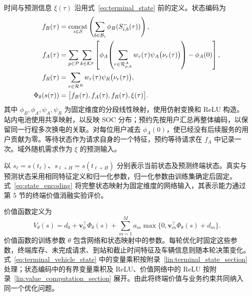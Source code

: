 时间与预测信息 $\xi(\tau)$ 沿用式~\eqref{eq:terminal_state} 前的定义。状态编码为
\begin{equation}
\begin{aligned}
f_B(\tau)&=\mathop{\mathrm{concat}}_{i\in\mathcal S}
\left(\sum_{b\in\mathcal B_i}\phi_B(S_{i,b}^{-}(\tau))\right),\\
f_A(\tau)&=\sum_{p\in\mathcal P}\sum_{k\in\mathcal K^p}
\left[\phi_A\!\left(\sum_{r\in\mathcal R_{p,k}^A}w_r(\tau)\psi_A\bigl(\nu_r(\tau)\bigr)\right)-\phi_A(0)\right],\\
f_R(\tau)&=\sum_{r\in\mathcal R^R}w_r(\tau)\psi_R\bigl(\nu_r(\tau)\bigr),\\
\Phi_\theta(s(\tau))&=\bigl[f_B(\tau),f_A(\tau),f_R(\tau),\xi(\tau)\bigr].
\end{aligned}
\label{eq:state_encoding}
\end{equation}
其中 $\phi_B,\phi_A,\psi_A,\psi_R$ 为固定维度的分段线性映射，使用仿射变换和 ReLU 构造。站内电池使用共享映射，以反映 SOC 分布；预约先按用户汇总再整体编码，以保留同一行程多次换电的关联。对每位用户减去 $\phi_A(0)$，使已经没有后续服务的用户贡献为零。等待状态作为请求自身的一个特征，预约等待请求在 $f_A$ 中记录一次。域外随机需求作为 $\xi$ 的预测输入。

以 $s_\ell=s(t_\ell)$、$s_{\ell+H}=s(t_{\ell+H})$ 分别表示当前状态及预测终端状态。真实与预测状态采用相同特征定义和归一化参数，归一化参数由训练集确定后固定。式~\eqref{eq:state_encoding} 将完整状态映射为固定维度的网络输入，其表示能力通过第 5 节的终端价值消融实验评价。

价值函数定义为
\begin{equation}
V_\theta(s)
=d_0+\boldsymbol v_0^\top\Phi_\theta(s)
+\sum_{m=1}^{M}a_m\max\{0,\boldsymbol v_m^\top\Phi_\theta(s)+d_m\}.
\label{eq:value_network}
\end{equation}
价值函数的训练参数 $\theta$ 包含网络和状态映射中的参数。每轮优化时固定这些参数，终端库存、未完成请求、到站和截止时间特征及车辆信息则随本轮决策变化。式~\eqref{eq:terminal_vehicle_state} 中的变量乘积按附录~\ref{lin:terminal_state_section} 处理；状态编码中的有界变量乘积及 ReLU、价值网络中的 ReLU 按附录~\ref{lin:value_computation_section} 展开。由此将终端价值与业务约束共同纳入同一个优化问题。

